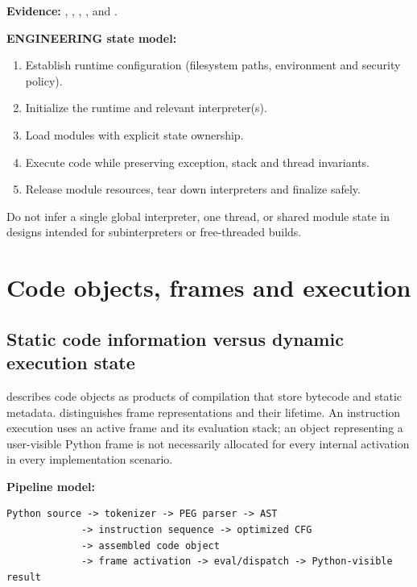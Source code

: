 \documentclass[
  11pt,
]{report}
\providecommand{\tightlist}{%
  \setlength{\itemsep}{0pt}\setlength{\parskip}{0pt}}
\begin{document}
\textbf{Evidence:} ,
,
,
, and
.

\textbf{ENGINEERING state model:}

\begin{enumerate}
\def\labelenumi{\arabic{enumi}.}
\tightlist
\item
  Establish runtime configuration (filesystem paths, environment and
  security policy).
\item
  Initialize the runtime and relevant interpreter(s).
\item
  Load modules with explicit state ownership.
\item
  Execute code while preserving exception, stack and thread invariants.
\item
  Release module resources, tear down interpreters and finalize safely.
\end{enumerate}

Do not infer a single global interpreter, one thread, or shared module
state in designs intended for subinterpreters or free-threaded builds.

\chapter{Code objects, frames and
execution}\label{code-objects-frames-and-execution}

\section{Static code information versus dynamic execution
state}\label{static-code-information-versus-dynamic-execution-state}

 describes code
objects as products of compilation that store bytecode and static
metadata.  distinguishes
frame representations and their lifetime. An instruction execution uses
an active frame and its evaluation stack; an object representing a
user-visible Python frame is not necessarily allocated for every
internal activation in every implementation scenario.

\textbf{Pipeline model:}

\begin{lstlisting}
Python source -> tokenizer -> PEG parser -> AST
             -> instruction sequence -> optimized CFG
             -> assembled code object
             -> frame activation -> eval/dispatch -> Python-visible result
\end{lstlisting}
\end{document}
